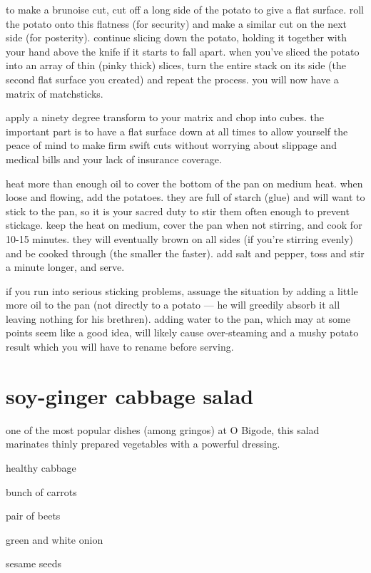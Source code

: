 to make a brunoise cut, cut off a long side of the potato to give a flat 
surface. roll the potato onto this flatness (for security) and make a similar 
cut on the next side (for posterity). continue slicing down the potato, 
holding it together with your hand above the knife if it starts to fall apart. 
when you've sliced the potato into an array of thin (pinky thick) slices, turn 
the entire stack on its side (the second flat surface you created) and repeat 
the process. you will now have a matrix of matchsticks.

apply a ninety degree transform to your matrix and chop into cubes. the 
important part is to have a flat surface down at all times to allow yourself 
the peace of mind to make firm swift cuts without worrying about slippage and 
medical bills and your lack of insurance coverage.

heat more than enough oil to cover the bottom of the pan on medium heat. when 
loose and flowing, add the potatoes. they are full of starch (glue) and will 
want to stick to the pan, so it is your sacred duty to stir them often enough 
to prevent stickage. keep the heat on medium, cover the pan when not stirring, 
and cook for 10-15 minutes. they will eventually brown on all sides (if you're 
stirring evenly) and be cooked through (the smaller the faster). add salt and 
pepper, toss and stir a minute longer, and serve.

if you run into serious sticking problems, assuage the situation by adding a 
little more oil to the pan (not directly to a potato --- he will greedily 
absorb it all leaving nothing for his brethren). adding water to the pan, 
which may at some points seem like a good idea, will likely cause 
over-steaming and a mushy potato result which you will have to rename before 
serving.

\section{soy-ginger cabbage salad}

one of the most popular dishes (among gringos) at O Bigode, this salad 
marinates thinly prepared vegetables with a powerful dressing.

\begin{ingredients}
  \item healthy cabbage
  \item bunch of carrots
  \item pair of beets
  \item green and white onion
  \item sesame seeds
\end{ingredients}

